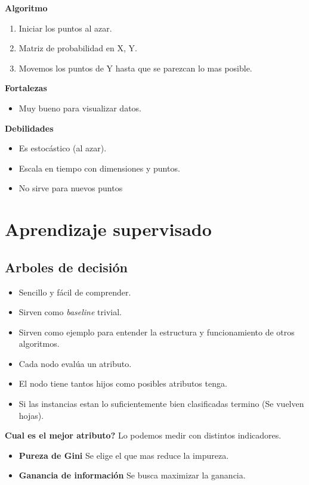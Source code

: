 \documentclass[titlepage,a4paper]{article}
\begin{document}
\textbf{Algoritmo}
\begin{enumerate}
    \item Iniciar los puntos al azar.
    \item Matriz de probabilidad en X, Y.
    \item Movemos los puntos de Y hasta que se parezcan lo mas posible.
\end{enumerate}

\textbf{Fortalezas}
\begin{itemize}
    \item Muy bueno para visualizar datos.
\end{itemize}

\textbf{Debilidades}
\begin{itemize}
    \item Es estocástico (al azar).
    \item Escala en tiempo con dimensiones y puntos.
    \item No sirve para nuevos puntos
\end{itemize}

\section{Aprendizaje supervisado}
\subsection{Arboles de decisión}
\begin{itemize}
    \item Sencillo y fácil de comprender.
    \item Sirven como \textit{baseline} trivial.
    \item Sirven como ejemplo para entender la estructura y funcionamiento de otros algoritmos.
    \item Cada nodo evalúa un atributo.
    \item El nodo tiene tantos hijos como posibles atributos tenga.
    \item Si las instancias estan lo suficientemente bien clasificadas termino (Se vuelven hojas).
\end{itemize}

\textbf{Cual es el mejor atributo?}
Lo podemos medir con distintos indicadores.
\begin{itemize}
    \item \textbf{Pureza de Gini} Se elige el que mas reduce la impureza. %
    \item \textbf{Ganancia de información} Se busca maximizar la ganancia. %
\end{itemize}
\end{document}
